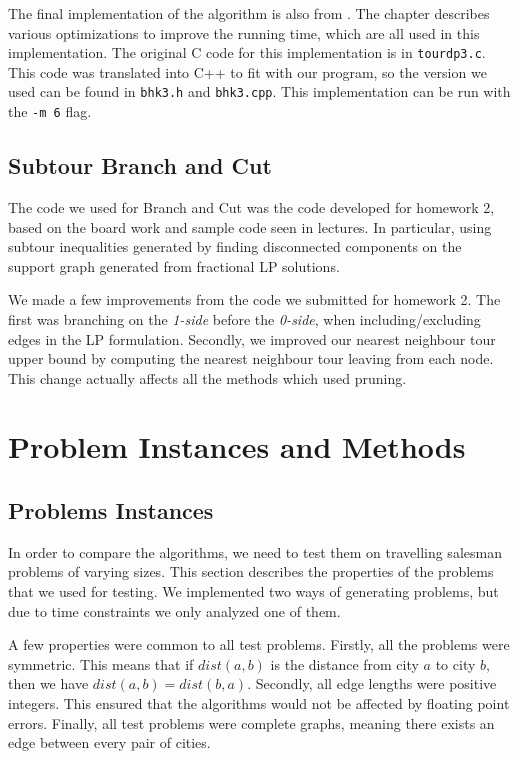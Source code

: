 \documentclass[11pt]{article}
\begin{document}
	The final implementation of the algorithm is also from \cite{bico}. The chapter describes various optimizations to improve the running time, which are all used in this implementation. The original C code for this implementation is in \texttt{tour{\textunderscore}dp3.c}. This code was translated into C++ to fit with our program, so the version we used can be found in \texttt{bhk3.h} and \texttt{bhk3.cpp}. This implementation can be run with the \texttt{-m 6} flag.
	
	\subsection{Subtour Branch and Cut}
	
	The code we used for Branch and Cut was the code developed for homework 2, based on the board work and sample code seen in lectures. In particular, using subtour inequalities generated by finding disconnected components on the support graph generated from fractional LP solutions.
	
	We made a few improvements from the code we submitted for homework 2. The first was branching on the \emph{1-side} before the \emph{0-side}, when including/excluding edges in the LP formulation. Secondly, we improved our nearest neighbour tour upper bound by computing the nearest neighbour tour leaving from each node. This change actually affects all the methods which used pruning. 
	
	\section{Problem Instances and Methods}
	\label{sec:methodology}
		
	\subsection{Problems Instances}
	\label{sec:data}
	In order to compare the algorithms, we need to test them on travelling salesman problems of varying sizes. This section describes the properties of the problems that we used for testing. We implemented two ways of generating problems, but due to time constraints we only analyzed one of them.
	
	A few properties were common to all test problems. Firstly, all the problems were symmetric. This means that if $dist(a,b)$ is the distance from city $a$ to city $b$, then we have $dist(a,b) = dist(b,a)$. Secondly, all edge lengths were positive integers. This ensured that the algorithms would not be affected by floating point errors. Finally, all test problems were complete graphs, meaning there exists an edge between every pair of cities.
	
\end{document}
